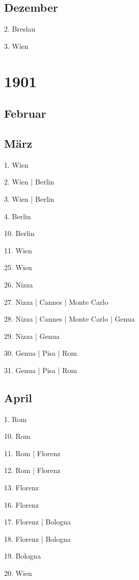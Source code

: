\documentclass[twoside=false,titlepage=false,open=any, parskip=never, fontsize=10pt, headings=small, chapterprefix=false, appendixprefix=false, DIV=15]{scrbook}
\begin{document}
\begin{multicols}{3}
            \section*{Dezember}
            2. Breslau\par
            3. Wien\par
            \chapter*{1901}
            \section*{Februar}
            \section*{März}
            1. Wien\par
            2. Wien | Berlin\par
            3. Wien | Berlin\par
            4. Berlin\par
            10. Berlin\par
            11. Wien\par
            25. Wien\par
            26. Nizza\par
            27. Nizza | Cannes | Monte Carlo\par
            28. Nizza | Cannes | Monte Carlo | Genua\par
            29. Nizza | Genua\par
            30. Genua | Pisa | Rom\par
            31. Genua | Pisa | Rom\par
            \section*{April}
            1. Rom\par
            10. Rom\par
            11. Rom | Florenz\par
            12. Rom | Florenz\par
            13. Florenz\par
            16. Florenz\par
            17. Florenz | Bologna\par
            18. Florenz | Bologna\par
            19. Bologna\par
            20. Wien\par

\end{multicols}
\end{document}
